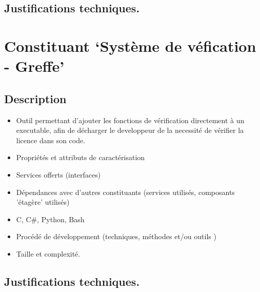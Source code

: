 \subsection{Justifications techniques.}

\section{Constituant `Système de véfication - Greffe'}
\subsection{Description}
\begin{itemize}
	\item Outil permettant d'ajouter les fonctions de vérification directement à un
				executable, afin de décharger le developpeur de la necessité de vérifier 
				la licence dans son code.
	\item Propriétés et attributs de caractérisation
	\item Services offerts (interfaces)
	\item Dépendances avec d’autres constituants (services utilisés, composants 'étagère' utilisés)
	\item C, C\#, Python, Bash 
	\item Procédé de développement (techniques, méthodes et/ou outils )
	\item Taille et complexité.
\end{itemize}
\subsection{Justifications techniques.}

